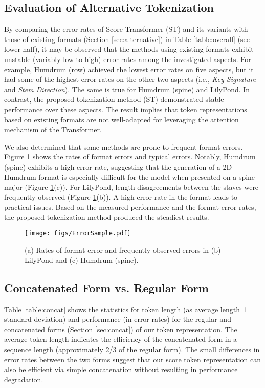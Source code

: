 \documentclass[sigconf]{acmart} %
\begin{document}
\subsection{Evaluation of Alternative Tokenization}
By comparing the error rates of Score Transformer (ST) and its variants with those of existing formats (Section \ref{sec:alternative}) in Table \ref{table:overall} (see lower half), it may be observed that the methods using existing formats exhibit unstable (variably low to high) error rates among the investigated aspects. For example, Humdrum (row) achieved the lowest error rates on five aspects, but it had some of the highest error rates on the other two aspects (i.e., \textit{Key Signature} and \textit{Stem Direction}). The same is true for Humdrum (spine) and LilyPond. In contrast, the proposed tokenization method (ST) demonstrated stable performance over these aspects. The result implies that token representations based on existing formats are not well-adapted for leveraging the attention mechanism of the Transformer.

We also determined that some methods are prone to frequent format errors. Figure \ref{fig:errors} shows the rates of format errors and typical errors. Notably, Humdrum (spine) exhibits a high error rate, suggesting that the generation of a 2D Humdrum format is especially difficult for the model when presented on a spine-major (Figure \ref{fig:errors}(c)). For LilyPond, length disagreements between the staves were frequently observed (Figure \ref{fig:errors}(b)). A high error rate in the format leads to practical issues. Based on the measured performance and the format error rates, the proposed tokenization method produced the steadiest results. 

\begin{figure}[h]
 \centerline{
 \texttt{[image: figs/ErrorSample.pdf]}}
 \caption{(a) Rates of format error and frequently observed errors in (b) LilyPond and (c) Humdrum (spine).}
 \label{fig:errors}
\end{figure}

\subsection{Concatenated Form vs. Regular Form}
Table \ref{table:concat} shows the statistics for token length (as average length ± standard deviation) and performance (in error rates) for the regular and concatenated forms (Section \ref{sec:concat}) of our token representation. The average token length indicates the efficiency of the concatenated form in a sequence length (approximately 2/3 of the regular form). The small differences in error rates between the two forms suggest that our score token representation can also be efficient via simple concatenation without resulting in performance degradation.
\end{document}
